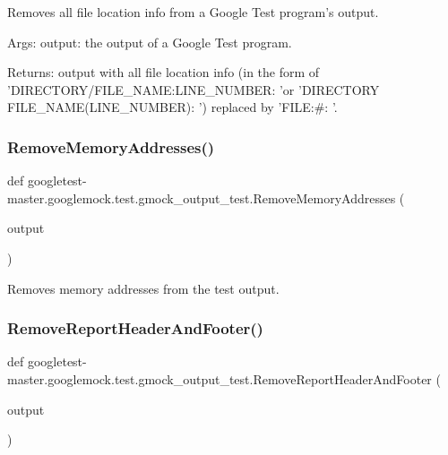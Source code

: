 \begin{DoxyVerb}Removes all file location info from a Google Test program's output.

Args:
     output:  the output of a Google Test program.

Returns:
     output with all file location info (in the form of
     'DIRECTORY/FILE_NAME:LINE_NUMBER: 'or
     'DIRECTORY\\FILE_NAME(LINE_NUMBER): ') replaced by
     'FILE:#: '.
\end{DoxyVerb}
 \mbox{\label{namespacegoogletest-master_1_1googlemock_1_1test_1_1gmock__output__test_a3abad68f2ceddcd56df89df82e0a73ba}} 
\subsubsection{\texorpdfstring{RemoveMemoryAddresses()}{RemoveMemoryAddresses()}}
{\footnotesize\ttfamily def googletest-\/master.\+googlemock.\+test.\+gmock\+\_\+output\+\_\+test.\+Remove\+Memory\+Addresses (\begin{DoxyParamCaption}\item[{}]{output }\end{DoxyParamCaption})}

\begin{DoxyVerb}Removes memory addresses from the test output.\end{DoxyVerb}
 \mbox{\label{namespacegoogletest-master_1_1googlemock_1_1test_1_1gmock__output__test_a36ac7596b56fb98251c967892b3084e8}} 
\subsubsection{\texorpdfstring{RemoveReportHeaderAndFooter()}{RemoveReportHeaderAndFooter()}}
{\footnotesize\ttfamily def googletest-\/master.\+googlemock.\+test.\+gmock\+\_\+output\+\_\+test.\+Remove\+Report\+Header\+And\+Footer (\begin{DoxyParamCaption}\item[{}]{output }\end{DoxyParamCaption})}

